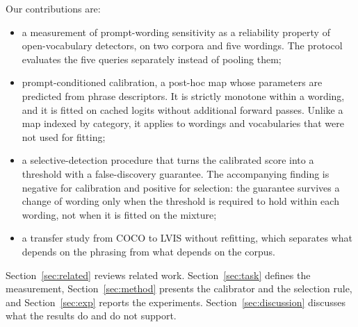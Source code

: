 Our contributions are:

\begin{itemize}
\item a measurement of prompt-wording sensitivity as a reliability property of
open-vocabulary detectors, on two corpora and five wordings. The protocol evaluates the five
queries separately instead of pooling them;
\item prompt-conditioned calibration, a post-hoc map whose parameters are predicted from
phrase descriptors. It is strictly monotone within a wording, and it is fitted on cached
logits without additional forward passes. Unlike a map indexed by category, it applies to
wordings and vocabularies that were not used for fitting;
\item a selective-detection procedure that turns the calibrated score into a threshold with a
false-discovery guarantee. The accompanying finding is negative for calibration and positive
for selection: the guarantee survives a change of wording only when the threshold is required
to hold within each wording, not when it is fitted on the mixture;
\item a transfer study from COCO to LVIS without refitting, which separates what depends on
the phrasing from what depends on the corpus.
\end{itemize}

Section~\ref{sec:related} reviews related work. Section~\ref{sec:task} defines the
measurement, Section~\ref{sec:method} presents the calibrator and the selection rule, and
Section~\ref{sec:exp} reports the experiments. Section~\ref{sec:discussion} discusses what
the results do and do not support.
